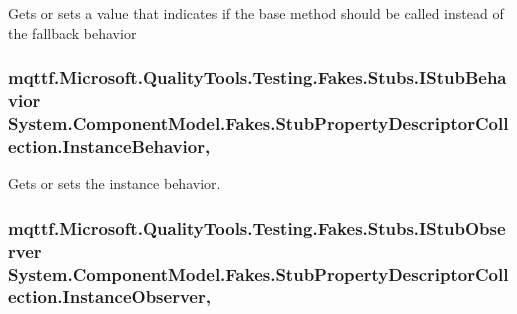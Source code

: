Gets or sets a value that indicates if the base method should be called instead of the fallback behavior

\hypertarget{class_system_1_1_component_model_1_1_fakes_1_1_stub_property_descriptor_collection_a5ab84fc3292da4fa6cf9cfe213884a17}{
\subsubsection[{Instance\-Behavior}]{\setlength{\rightskip}{0pt plus 5cm}mqttf.\-Microsoft.\-Quality\-Tools.\-Testing.\-Fakes.\-Stubs.\-I\-Stub\-Behavior System.\-Component\-Model.\-Fakes.\-Stub\-Property\-Descriptor\-Collection.\-Instance\-Behavior\hspace{0.3cm}{\ttfamily [get]}, {\ttfamily [set]}}}\label{class_system_1_1_component_model_1_1_fakes_1_1_stub_property_descriptor_collection_a5ab84fc3292da4fa6cf9cfe213884a17}


Gets or sets the instance behavior.

\hypertarget{class_system_1_1_component_model_1_1_fakes_1_1_stub_property_descriptor_collection_aaf9ca88ba0aac3184ec5b3ccb8656d8b}{
\subsubsection[{Instance\-Observer}]{\setlength{\rightskip}{0pt plus 5cm}mqttf.\-Microsoft.\-Quality\-Tools.\-Testing.\-Fakes.\-Stubs.\-I\-Stub\-Observer System.\-Component\-Model.\-Fakes.\-Stub\-Property\-Descriptor\-Collection.\-Instance\-Observer\hspace{0.3cm}{\ttfamily [get]}, {\ttfamily [set]}}}\label{class_system_1_1_component_model_1_1_fakes_1_1_stub_property_descriptor_collection_aaf9ca88ba0aac3184ec5b3ccb8656d8b}


